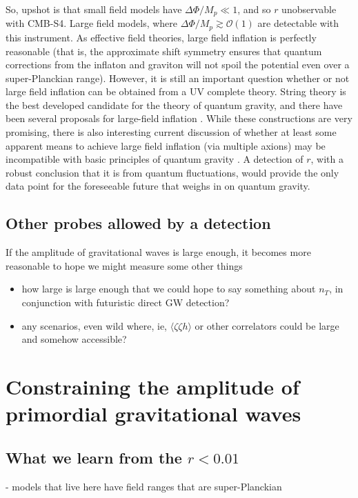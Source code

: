 So, upshot is that small field models have $\Delta\Phi/M_p\ll 1$, and so $r$ unobservable with CMB-S4. Large field models, where $\Delta\Phi/M_p\gtrsim\mathcal{O}(1)$ are detectable with this instrument. As effective field theories, large field inflation is perfectly reasonable \cite{Linde:2005ht, Kaloper:2011jz, Csaki:2014bua,Kaplan:2015fuy,Choi:2015fiu} (that is, the approximate shift symmetry ensures that quantum corrections from the inflaton and graviton will not spoil the potential even over a super-Planckian range). However, it is still an important question whether or not large field inflation can be obtained from a UV complete theory. String theory is the best developed candidate for the theory of quantum gravity, and there have been several proposals for large-field inflation \cite{Silverstein:2008sg, McAllister:2008hb, Berg:2009tg, Palti:2014kza,McAllister:2014mpa, Marchesano:2014mla, Blumenhagen:2015xpa}. While these constructions are very promising, there is also interesting current discussion of whether at least some apparent means to achieve large field inflation (via multiple axions) may be incompatible with basic principles of quantum gravity \cite{delaFuente:2014aca,Bachlechner:2015qja,Heidenreich:2015wga,Kooner:2015rza}. A detection of $r$, with a robust conclusion that it is from quantum fluctuations, would provide the only data point for the foreseeable future that weighs in on quantum gravity.

\subsection{Other probes allowed by a detection}
If the amplitude of gravitational waves is large enough, it becomes more reasonable to hope we might measure some other things
 \begin{itemize}
\item how large is large enough that we could hope to say something about $n_T$, in conjunction with futuristic direct GW detection?
\item any scenarios, even wild where, ie, $\langle\zeta\zeta h\rangle$ or other correlators could be large and somehow accessible?
 \end{itemize}

\section{Constraining the amplitude of primordial gravitational waves} 
\label{sec:upperLimits}
\subsection{What we learn from the $r<0.01$}
- models that live here have field ranges that are super-Planckian



